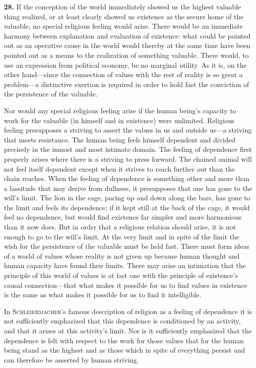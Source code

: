 \documentclass[12pt,a4paper]{book}
\newcommand{\opage}[1]{\marginnote{\footnotesize\textit{[#1]}}}
\begin{document}
\medskip

\noindent\textbf{28.} If the conception of the world immediately showed us the
highest valuable thing realized, or at least clearly showed us existence as the
secure home of the valuable, no special religious feeling would arise. There
would be an immediate harmony between explanation and evaluation of existence:
what could be pointed out as an operative cause in the world would thereby at the
same time have been pointed out as a means to the realization of something
valuable. There would, to use an expression from political economy, be no
marginal utility. As it is, on the other hand---since the connection of values
with the rest of reality is so great a problem---a distinctive exertion is
required in order to hold fast the conviction of the persistence of the valuable.

Nor would any special religious feeling arise if the human being's capacity to
work for the valuable (in himself and in existence) were unlimited. Religious
feeling presupposes a striving to assert the values in us and outside us---a
striving that meets resistance. The human being feels himself dependent and
divided precisely in the inmost and most intimate domain. The feeling of
dependence first properly arises where there is a striving to press forward. The
chained animal will not feel itself dependent except when it strives to reach
further out than the chain reaches. When the feeling of dependence is something
other and more than a lassitude that may derive from dullness, it presupposes that
one has gone to the will's limit. The lion in the cage, pacing up and down along
the bars, has gone to the limit and feels its dependence; if it kept still at the
back of the cage, it would feel no dependence, but would find existence far
simpler and more harmonious than it now does. But in order that a religious
relation should arise, it is not enough to go to the will's limit. At the very
limit and in spite of the limit the wish for the persistence of the valuable must
be held fast. There must form ideas of a world of values whose reality is not
given up because human thought and human capacity have found their limits. There
may arise an intimation that the principle of this world of values is 
\opage{69}at last one
with the principle of existence's causal connection---that what makes it possible
for us to find values in existence is the same as what makes it possible for us to
find it intelligible.

In \textsc{Schleiermacher}'s famous description of religion as a feeling of
dependence it is not sufficiently emphasized that this dependence is conditioned
by an activity, and that it arises at this activity's limit. Nor is it
sufficiently emphasized that the dependence is felt with respect to the work for
those values that for the human being stand as the highest and as those which in
spite of everything persist and can therefore be asserted by human striving.
\end{document}
